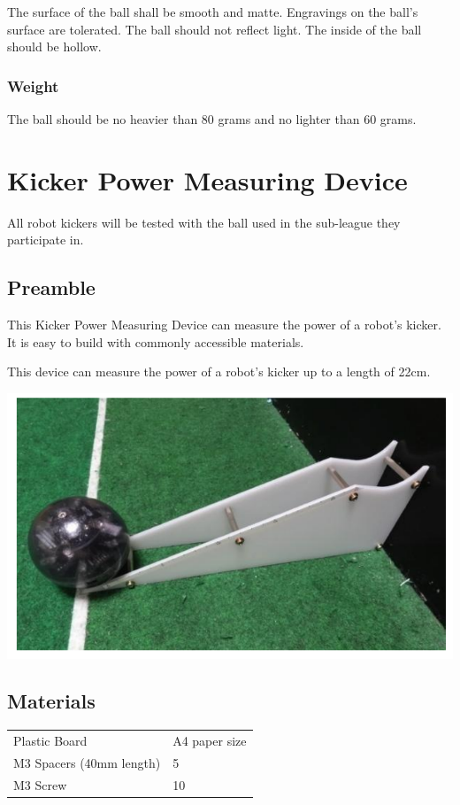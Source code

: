 \documentclass{article}
\begin{document}
The surface of the ball shall be smooth and matte. Engravings on the ball's
surface are tolerated. The ball should not reflect light. The inside of the
ball should be hollow.

\subsubsection{Weight}

The ball should be no heavier than 80 grams and no lighter than 60 grams.

\section{Kicker Power Measuring Device\label{ref-064}}

All robot kickers will be tested with the ball used in the sub-league they
participate in.

\subsection{Preamble}

This Kicker Power Measuring Device can measure the power of a robot's kicker.
It is easy to build with commonly accessible materials.

This device can measure the power of a robot's kicker up to a length of 22cm.

\includegraphics[width=1\textwidth]{media/image8.png}

\subsection{Materials}

\begin{table}
\begin{tabularx}{\textwidth}{
p{}
p{}}
Plastic Board & A4 paper size \\
M3 Spacers (40mm length) & 5 \\
M3 Screw & 10 \\

\end{tabularx}

\end{table}
\end{document}
